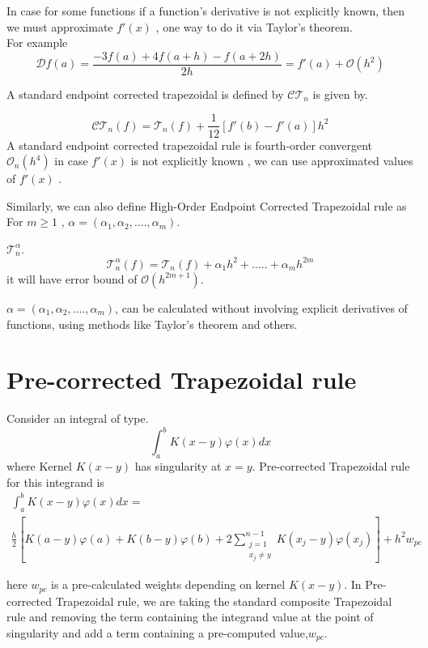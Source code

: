 \documentclass[../document.tex]{subfiles}
\begin{document}
	In case for some functions if a function's derivative is not explicitly known, then we must approximate $f'(x)$ , one way to do it via Taylor's theorem.
	\\For example
	$$
	\mathcal{D}f(a) = 
	\frac{-3f(a) + 4f(a+h) -f(a+2h)}{2h} = f'(a) +\mathcal{O}(h^2)
	$$
	
	A standard endpoint corrected trapezoidal is defined by $\mathcal{CT}_n$ is given by.
	
	$$
	\mathcal{CT}_n(f)  = \mathcal{T}_n(f) + \frac{1}{12}
	\left[
	f'(b)  - f'(a)
	\right] h^2
	$$
	A standard endpoint corrected trapezoidal rule is fourth-order convergent $\mathcal{O}_n(h^4)$
	in case  $f'(x)$ is not explicitly known , we can use approximated
	values of $f'(x)$ .
	
	\vspace{3mm} %
	
	
	Similarly, we can also define High-Order Endpoint Corrected Trapezoidal rule as
	For $m\geq 1$ ,
	$\alpha = (\alpha_1,\alpha_2,....,\alpha_m)$.
	
	
	$\mathcal{T}_n^{\alpha}$. 
	$$\mathcal{T}_n^{\alpha} (f) =  \mathcal{T}_n(f) +\alpha_1h^2 +.....
	+\alpha_m h^{2m}
	$$ 
	it will have  error bound of $ \mathcal{O}(h^{2m+1})$.
	
	$\alpha = (\alpha_1,\alpha_2,....,\alpha_m)$, can be calculated without involving explicit derivatives of functions, using methods like Taylor's theorem and others. 
	
	\section{Pre-corrected Trapezoidal rule}
	Consider an integral of type.
	$$
	\int_a^b K(x-y)\varphi(x)dx
	$$
	where Kernel $K(x-y)$ has singularity at $x=y$. Pre-corrected Trapezoidal rule for this integrand is
	\begin{multline*}
		\int_a^b K(x-y)\varphi(x)dx =\\ 
		\frac{h}{2}
		\left[
		K(a-y)\varphi(a) +  K(b-y)\varphi(b) +
		2\sum_{\substack{  	j=1 \\x_j \neq y}}^{n-1}
		K(x_j-y)\varphi(x_j)
		\right]  + h^2 w_{pc} 
	\end{multline*}
	
	here $w_{pc}$ is a pre-calculated weights depending on kernel $K(x-y)$. In 
	Pre-corrected Trapezoidal rule, we are taking the standard composite Trapezoidal rule and removing the term containing the integrand value at the point of singularity and add a term containing a pre-computed value,$ w_{pc}$.
	
\end{document}
